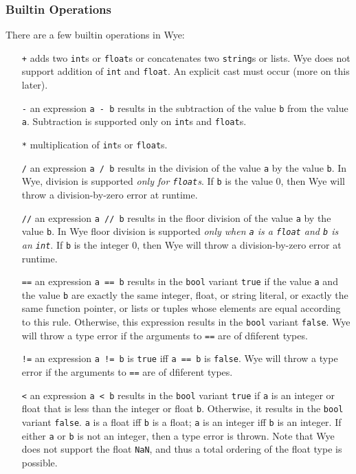 \documentclass[a4paper, 12pt]{article}
\begin{document}
\subsubsection{Builtin Operations}
There are a few builtin operations in Wye:
\begin{itemize}
\item[\texttt{+}] adds two \texttt{int}s or \texttt{float}s or concatenates two \texttt{string}s or lists. Wye does not support addition of \texttt{int} and \texttt{float}. An explicit cast must occur (more on this later).
\item[\texttt{-}] an expression \texttt{a - b} results in the subtraction of the value \texttt{b} from the value \texttt{a}. Subtraction is supported only on \texttt{int}s and \texttt{float}s.
\item[\texttt{*}] multiplication of \texttt{int}s or \texttt{float}s.
\item[\texttt{/}] an expression \texttt{a / b} results in the division of the value \texttt{a} by the value \texttt{b}. In Wye, division is supported \textit{only for \texttt{float}s}. If \texttt{b} is the value 0, then Wye will throw a division-by-zero error at runtime.
\item[\texttt{//}] an expression \texttt{a // b} results in the floor division of the value \texttt{a} by the value \texttt{b}. In Wye floor division is supported \textit{only when \texttt{a} is a \texttt{float} and \texttt{b} is an \texttt{int}}. If \texttt{b} is the integer 0, then Wye will throw a division-by-zero error at runtime.
\item[\texttt{==}] an expression \texttt{a == b} results in the \texttt{bool} variant \texttt{true} if the value \texttt{a} and the value \texttt{b} are exactly the same integer, float, or string literal, or exactly the same function pointer, or lists or tuples whose elements are equal according to this rule. Otherwise, this expression results in the \texttt{bool} variant \texttt{false}. Wye will throw a type error if the arguments to \texttt{==} are of dfiferent types.
\item[\texttt{!=}] an expression \texttt{a != b} is \texttt{true} iff \texttt{a == b} is \texttt{false}. Wye will throw a type error if the arguments to \texttt{==} are of dfiferent types.
\item[\texttt{<}] an expression \texttt{a < b} results in the \texttt{bool} variant \texttt{true} if \texttt{a} is an integer or float that is less than the integer or float \texttt{b}. Otherwise, it results in the \texttt{bool} variant \texttt{false}. \texttt{a} is a float iff \texttt{b} is a float; \texttt{a} is an integer iff \texttt{b} is an integer. If either \texttt{a} or \texttt{b} is not an integer, then a type error is thrown. Note that Wye does not support the float \texttt{NaN}, and thus a total ordering of the float type is possible.

\end{itemize}
\end{document}
